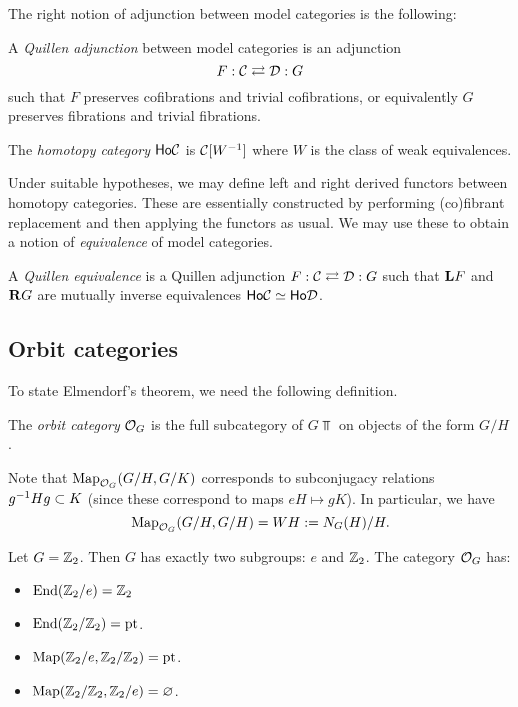 \documentclass{article}
\begin{document}
The right notion of adjunction between model categories is the following:

\begin{dfn}
  A \emph{Quillen adjunction} between model categories is an adjunction
  \[
    F: \mathcal{C} \rightleftarrows \mathcal{D} : G
  \]
  such that $F$ preserves cofibrations and trivial cofibrations, or equivalently $G$ preserves fibrations and trivial fibrations.
\end{dfn}

\begin{dfn}
  The \emph{homotopy category} $\mathsf{Ho} \mathcal{C}$ is $\mathcal{C}[W^{-1}]$ where $W$ is the class of weak equivalences.
\end{dfn}

Under suitable hypotheses, we may define left and right derived functors between homotopy categories.
These are essentially constructed by performing (co)fibrant replacement and then applying the functors as usual.
We may use these to obtain a notion of \emph{equivalence} of model categories.

\begin{dfn}
  A \emph{Quillen equivalence} is a Quillen adjunction $F: \mathcal{C} \rightleftarrows \mathcal{D} :G$ such that $\mathbf{L} F$ and $\mathbf{R} G$ are mutually inverse equivalences $\mathsf{Ho} \mathcal{C} \simeq \mathsf{Ho} \mathcal{D}$.
\end{dfn}

\subsection{Orbit categories}

To state Elmendorf's theorem, we need the following definition.

\begin{dfn}
  The \emph{orbit category} $\mathcal{O}_G$ is the full subcategory of $G\Top$ on objects of the form $G / H$.
\end{dfn}

Note that $\operatorname{Map}_{\mathcal{O}_G}(G/H, G/K)$ corresponds to subconjugacy relations $g^{-1} H g \subset K$ (since these correspond to maps $eH \mapsto gK$).
In particular, we have
\[
  \operatorname{Map}_{\mathcal{O}_G}(G/H, G/H) = WH := N_G(H) / H.
\]

\begin{ex}
  Let $G = \mathbb{Z}_2$.
  Then $G$ has exactly two subgroups: $e$ and $\mathbb{Z}_2$.
  The category $\mathcal{O}_G$ has:
  \begin{itemize}
    \item $\operatorname{End}(\mathbb{Z}_2 / e) = \mathbb{Z}_2$
    \item $\operatorname{End}(\mathbb{Z}_2 / \mathbb{Z}_2) = \operatorname{pt}$.
    \item $\operatorname{Map}(\mathbb{Z}_2 / e, \mathbb{Z}_2 / \mathbb{Z}_2) = \operatorname{pt}$.
    \item $\operatorname{Map}(\mathbb{Z}_2 / \mathbb{Z}_2, \mathbb{Z}_2 / e) = \varnothing$.
  \end{itemize}
\end{ex}
\end{document}
